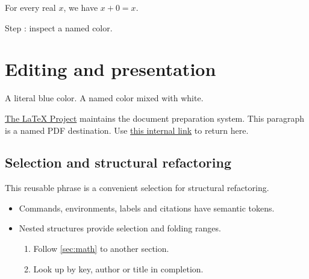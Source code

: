 \documentclass[11pt]{article}
\begin{document}
\begin{demotheorem}
  \label{thm:identity}
  For every real $x$, we have $x + 0 = x$.
\end{demotheorem}

\setcounter{demostep}{0}
Step : \textcolor{accent}{inspect a named color}.
\par\vspace{\demogap}

\newpage
\section{Editing and presentation}
\label{sec:editing}

\textcolor[HTML]{2563EB}{A literal blue color.}
\colorbox{accent!15!white}{A named color mixed with white.}

\href{https://www.latex-project.org/}{The LaTeX Project}
maintains the document preparation system.
\hypertarget{demo-target}{This paragraph is a named PDF destination.}
Use \hyperlink{demo-target}{this internal link} to return here.

\subsection{Selection and structural refactoring}
\label{sec:refactor}

This reusable phrase is a convenient selection for structural refactoring.

\begin{itemize}
  \item Commands, environments, labels and citations have semantic tokens.
  \item Nested structures provide selection and folding ranges.
    \begin{enumerate}
      \item Follow \ref{sec:math} to another section.
      \item Look up \cite{shannon1948} by key, author or title in completion.
    \end{enumerate}
\end{itemize}
\end{document}
